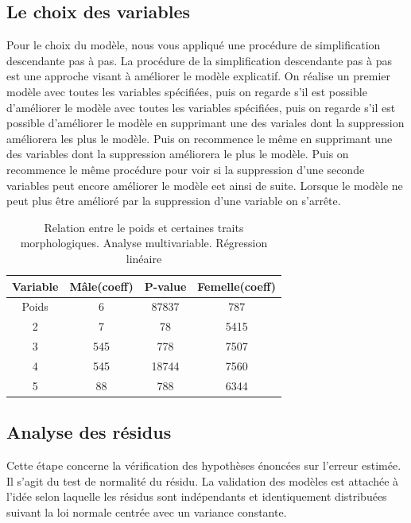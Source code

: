 \documentclass[12pt, twocolumn]{article}
\begin{document}
\subsection{Le choix des variables}
Pour le choix du modèle, nous vous appliqué une procédure de simplification descendante pas à pas. La procédure de la simplification
descendante pas à pas est une approche visant à améliorer le modèle explicatif. On réalise un premier modèle avec toutes les variables spécifiées,
puis on regarde s'il est possible d'améliorer le modèle avec toutes les variables spécifiées, puis on regarde s'il est possible d'améliorer le modèle
en supprimant une des variales dont la suppression améliorera les plus le modèle. Puis on recommence le même en supprimant une des variables dont la suppression améliorera le plus le modèle.
Puis on recommence le même procédure pour voir si la suppression d'une seconde variables peut encore améliorer le modèle eet ainsi de suite. Lorsque le modèle ne peut plus être amélioré par la suppression
d'une variable on s'arrête.

\begin{table}[h!]
    \centering
    \begin{tabular}{||c c c c||} 
     \hline
     Variable & Mâle(coeff) & P-value & Femelle(coeff) \\ [0.5ex] 
     \hline\hline
     Poids & 6 & 87837 & 787 \\ 
     2 & 7 & 78 & 5415 \\
     3 & 545 & 778 & 7507 \\
     4 & 545 & 18744 & 7560 \\
     5 & 88 & 788 & 6344 \\ [0.5ex] 
     \hline
    \end{tabular}
    \caption{Relation entre le poids et certaines traits morphologiques. Analyse multivariable. Régression linéaire}
    \label{table:3}
\end{table}

\subsection{Analyse des résidus}
Cette étape concerne la vérification des hypothèses énoncées sur l'erreur estimée. Il s'agit du test de normalité du résidu. La validation des modèles est attachée à
l'idée selon laquelle les résidus sont indépendants et identiquement distribuées suivant la loi normale centrée avec un variance constante.

\end{document}
